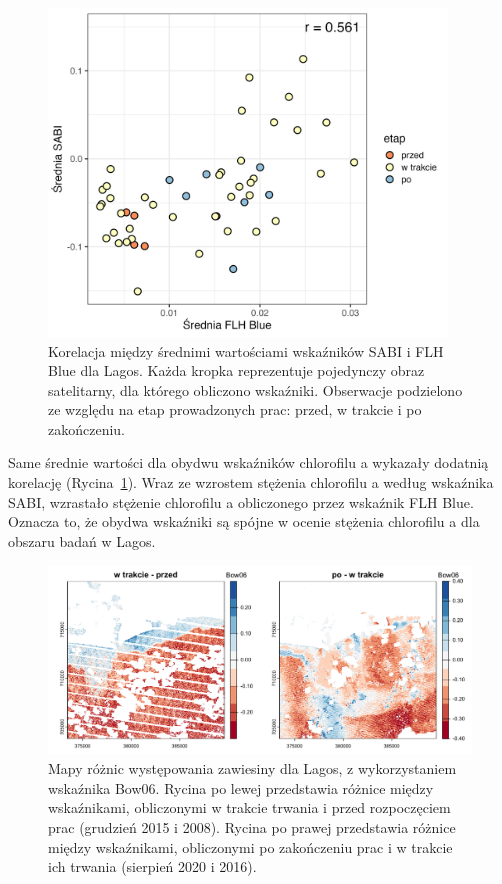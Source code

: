 \documentclass{amuthesis}
\begin{document}
\begin{figure}[t]

{\centering \includegraphics[width=4.16667in,height=\textheight]{figures/nigeria/sabi_flhblue_corr.png}

}

\caption{\label{fig-ng_sabi_flhblue_corr}Korelacja między średnimi
wartościami wskaźników SABI i FLH Blue dla Lagos. Każda kropka
reprezentuje pojedynczy obraz satelitarny, dla którego obliczono
wskaźniki. Obserwacje podzielono ze względu na etap prowadzonych prac:
przed, w trakcie i po zakończeniu.}

\end{figure}

Same średnie wartości dla obydwu wskaźników chlorofilu a wykazały
dodatnią korelację (Rycina~\ref{fig-ng_sabi_flhblue_corr}). Wraz ze
wzrostem stężenia chlorofilu a według wskaźnika SABI, wzrastało stężenie
chlorofilu a obliczonego przez wskaźnik FLH Blue. Oznacza to, że obydwa
wskaźniki są spójne w ocenie stężenia chlorofilu a dla obszaru badań w
Lagos.

\begin{figure}[t]

{\centering \includegraphics[width=6.25in,height=\textheight]{figures/nigeria/bow_diff.png}

}

\caption{\label{fig-ng_bow_diff}Mapy różnic występowania zawiesiny dla
Lagos, z wykorzystaniem wskaźnika Bow06. Rycina po lewej przedstawia
różnice między wskaźnikami, obliczonymi w trakcie trwania i przed
rozpoczęciem prac (grudzień 2015 i 2008). Rycina po prawej przedstawia
różnice między wskaźnikami, obliczonymi po zakończeniu prac i w trakcie
ich trwania (sierpień 2020 i 2016).}

\end{figure}
\end{document}
